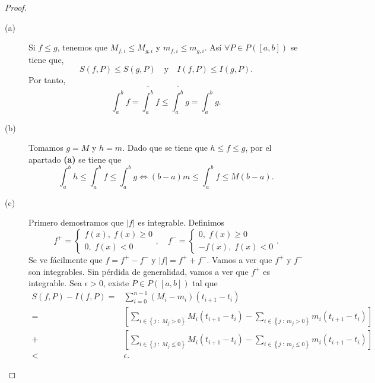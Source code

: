 \begin{proof}
\begin{description}
	\item[(a)] Si $\displaystyle f \leq g $, tenemos que $\displaystyle M_{f,i} \leq M_{g,i} $ y $\displaystyle m_{f,i} \leq m_{g,i} $. Así $\displaystyle \forall P \in P\left(\left[a,b\right] \right) $ se tiene que,
	\[ S\left(f,P\right) \leq S\left(g,P\right) \quad \text{y} \quad I\left(f,P\right) \leq I\left(g,P\right) .\]
	Por tanto, 
	\[ \int^{b}_{a} f = \overline{\int^{b}_{a}} f \leq \overline{\int^{b}_{a}} g = \int^{b}_{a} g  .\]
\item[(b)] Tomamos $\displaystyle g = M $ y $\displaystyle h = m $. Dado que se tiene que $\displaystyle h \leq f \leq g $, por el apartado \textbf{(a)} se tiene que 
	\[ \int^{b}_{a} h \leq \int^{b}_{a} f \leq \int^{b}_{a} g  \iff \left(b-a\right)m \leq \int^{b}_{a} f \leq M\left(b-a\right).\]
\item[(c)] Primero demostramos que $\displaystyle \left|f\right| $ es integrable. Definimos
	\[f^{+} = 
	\begin{cases}
	f\left(x\right), \; f\left(x\right) \geq 0 \\
	0, \; f\left(x\right) < 0
	\end{cases}
	, \quad f^{-} = 
\begin{cases}
0, \; f\left(x\right) \geq 0 \\
-f\left(x\right), \; f\left(x\right) < 0
\end{cases}
.\]
Se ve fácilmente que $\displaystyle f = f^{+} - f^{-} $ y $\displaystyle \left|f\right| = f^{+} + f^{-} $. Vamos a ver que $\displaystyle f^{+} $ y $\displaystyle f^{-} $ son integrables. Sin pérdida de generalidad, vamos a ver que $\displaystyle f^{+} $ es integrable. Sea $\displaystyle \epsilon > 0 $, existe $\displaystyle P \in P\left(\left[a,b\right] \right) $ tal que 
\[
\begin{split}
	S\left(f,P\right)-I\left(f,P\right) = & \sum^{n-1}_{i=0}\left(M_{i}-m_{i}\right)\left(t_{i+1}-t_{i}\right) \\
	= & \left[\sum^{}_{i \in \left\{ j \; : \; M_{j} > 0\right\}} M_{i}\left(t_{i+1}-t_{i}\right)-\sum^{}_{i \in \left\{ j \; : \; m_{j} > 0\right\} }m_{i}\left(t_{i+1}-t_{i}\right) \right] \\
	+ & \left[\sum^{}_{i \in \left\{ j \; : \; M_{j} \leq 0\right\}} M_{i}\left(t_{i+1}-t_{i}\right)-\sum^{}_{i \in \left\{ j \; : \; m_{j} \leq 0\right\} }m_{i}\left(t_{i+1}-t_{i}\right) \right] \\
	< & \epsilon .

\end{split}\]
\end{description}
\end{proof}
